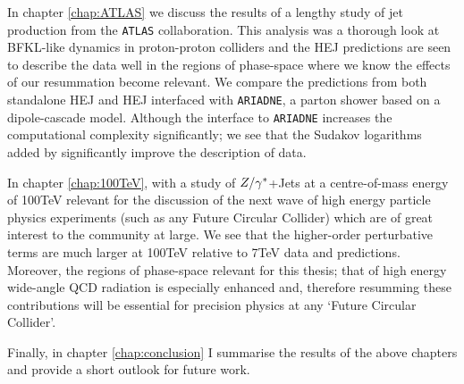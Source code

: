 	In chapter \ref{chap:ATLAS} we discuss the results of a lengthy study of jet production from the \texttt{ATLAS}
	collaboration.  This analysis was a thorough look at BFKL-like dynamics in proton-proton colliders and the HEJ
	predictions are seen to describe the data well in the regions of phase-space where we know the effects of our
	resummation become relevant.  We compare the predictions from both standalone HEJ and HEJ interfaced with
	\texttt{ARIADNE}, a parton shower based on a dipole-cascade model.  Although the interface to \texttt{ARIADNE}
	increases the computational complexity significantly; we see that the Sudakov logarithms added by significantly
	improve the description of data.

	In chapter \ref{chap:100TeV}, with a study of $Z/\gamma^*$+Jets at a centre-of-mass energy of 100TeV relevant for the
	discussion of the next wave of high energy particle physics experiments (such as any Future Circular Collider)
	which are of great interest to the community at large.  We see that the higher-order perturbative terms are
	much larger at 100TeV relative to 7TeV data and predictions.  Moreover, the regions of phase-space relevant
	for this thesis; that of high energy wide-angle QCD radiation is especially enhanced and, therefore resumming
	these contributions will be essential for precision physics at any `Future Circular Collider'.

	Finally, in chapter \ref{chap:conclusion} I summarise the results of the above chapters and provide a short
	outlook for future work.

